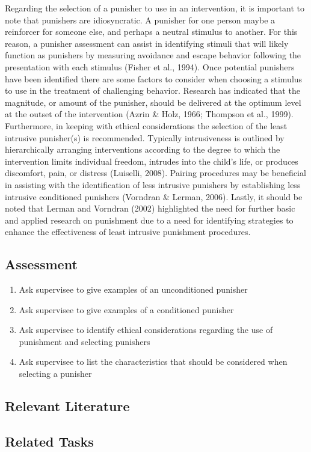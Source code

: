 Regarding the selection of a punisher to use in an intervention, it is important to note that punishers are idiosyncratic. A punisher for one person maybe a reinforcer for someone else, and perhaps a neutral stimulus to another. For this reason, a punisher assessment can assist in identifying stimuli that will likely function as punishers by measuring avoidance and escape behavior following the presentation with each stimulus (Fisher et al., 1994). Once potential punishers have been identified there are some factors to consider when choosing a stimulus to use in the treatment of challenging behavior. Research has indicated that the magnitude, or amount of the punisher, should be delivered at the optimum level at the outset of the intervention (Azrin \& Holz, 1966; Thompson et al., 1999).  Furthermore, in keeping with ethical considerations the selection of the least intrusive punisher(s) is recommended.  Typically intrusiveness is outlined by hierarchically arranging interventions according to the degree to which the intervention limits individual freedom, intrudes into the child's life, or produces discomfort, pain, or distress (Luiselli, 2008). Pairing procedures may be beneficial in assisting with the identification of less intrusive punishers by establishing less intrusive conditioned punishers (Vorndran \& Lerman, 2006).  Lastly, it should be noted that Lerman and Vorndran (2002) highlighted the need for further basic and applied research on punishment due to a need for identifying strategies to enhance the effectiveness of least intrusive punishment procedures. 
%
\subsection{Assessment}
\begin{enumerate}
\item Ask supervisee to give examples of an unconditioned punisher
\item Ask supervisee to give examples of a conditioned  punisher
\item Ask supervisee to identify ethical considerations regarding the use of punishment and selecting punishers 
\item Ask supervisee to list the characteristics that should be considered when selecting a punisher 
\end{enumerate}
%
\subsection{Relevant Literature}
\begin{refsection}
\nocite{azrin1966punishment,
        bac2014professional,
        cooper2007applied,
        fisher1994preliminary,
        iwata1988development,
        lerman2002status,
        luiselli2008effective,
        thompson1999effects,
        vorndran2006establishing}
\printbibliography[heading=none]
\end{refsection}
\subsection{Related Tasks}
\fourdSixteen{}\\
\fourdSeventeen{}\\
\fourjTwo{}\\
\fourjTen{}\\
\fourFKNineteen{}\\
\fourFKTwenty{}\\
\fourFKTwentyOne{}\\
\fourFKTwentyThree{}\\
